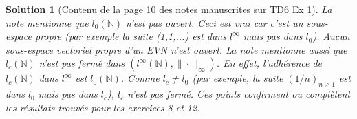 \documentclass{article}
\newtheorem{solution}{Solution}
\begin{document}
\begin{solution}
[Contenu de la page 10 des notes manuscrites sur TD6 Ex 1]
La note mentionne que $l_0(\mathbb{N})$ n'est pas ouvert. Ceci est vrai car c'est un sous-espace propre (par exemple la suite (1,1,...) est dans $l^\infty$ mais pas dans $l_0$). Aucun sous-espace vectoriel propre d'un EVN n'est ouvert.
La note mentionne aussi que $l_c(\mathbb{N})$ n'est pas fermé dans $(l^\infty(\mathbb{N}), \| \cdot \|_\infty)$.
En effet, l'adhérence de $l_c(\mathbb{N})$ dans $l^\infty$ est $l_0(\mathbb{N})$. Comme $l_c \neq l_0$ (par exemple, la suite $(1/n)_{n\ge 1}$ est dans $l_0$ mais pas dans $l_c$), $l_c$ n'est pas fermé.
Ces points confirment ou complètent les résultats trouvés pour les exercices 8 et 12.
\end{solution}
\end{document}
